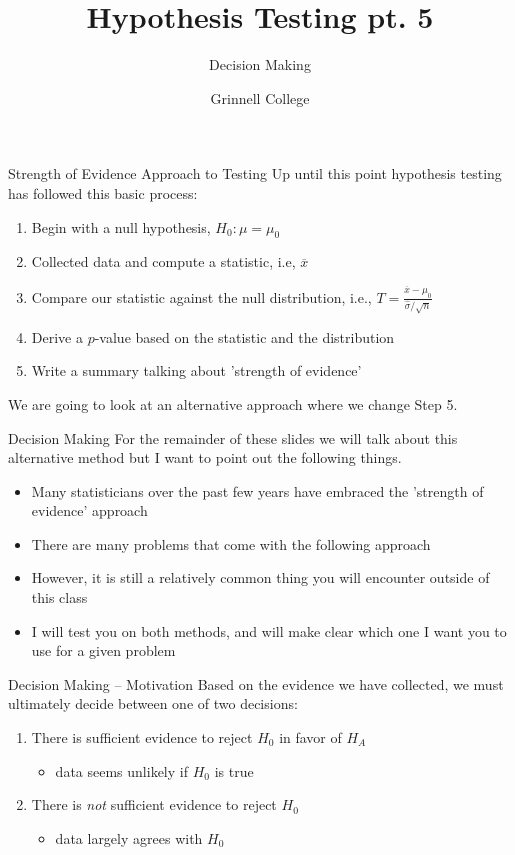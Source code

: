 \documentclass{beamer}
\title[Introduction to Statistics]{Hypothesis Testing pt. 5}
\subtitle{Decision Making}
\author{Grinnell College}
\date{}
\begin{document}
\begin{frame}
  \titlepage
\end{frame}

\begin{frame}{Strength of Evidence Approach to Testing}
Up until this point hypothesis testing has followed this basic process:

\begin{enumerate}
\item Begin with a null hypothesis, $H_0: \mu = \mu_0$
\item Collected data and compute a statistic, i.e, $\overline{x}$
\item Compare our statistic against the null distribution, i.e., $T = \frac{\overline{x} - \mu_0}{\hat{\sigma}/\sqrt{n}}$
\item Derive a $p$-value based on the statistic and the distribution
\item Write a summary talking about 'strength of evidence'
\end{enumerate} \vspace{8mm}

We are going to look at an alternative approach where we change Step 5.
\end{frame}

\begin{frame}{Decision Making}
For the remainder of these slides we will talk about this alternative method but I want to point out the following things.
\begin{itemize}
    \item Many statisticians over the past few years have embraced the 'strength of evidence' approach
    \item There are many problems that come with the following approach
    \item However, it is still a relatively common thing you will encounter outside of this class
    \item I will test you on both methods, and will make clear which one I want you to use for a given problem
\end{itemize}
\end{frame}

\begin{frame}{Decision Making -- Motivation}
Based on the evidence we have collected, we must ultimately decide between one of two decisions:
\vspace{2mm}
\begin{enumerate}
\item There is sufficient evidence to reject $H_0$ in favor of $H_A$
\begin{itemize}
    \item data seems unlikely if $H_0$ is true
\end{itemize} \vspace{2mm}
\item There is \textit{not} sufficient evidence to reject $H_0$
\begin{itemize}
    \item data largely agrees with $H_0$
\end{itemize}
\end{enumerate}
\end{frame}
\end{document}
